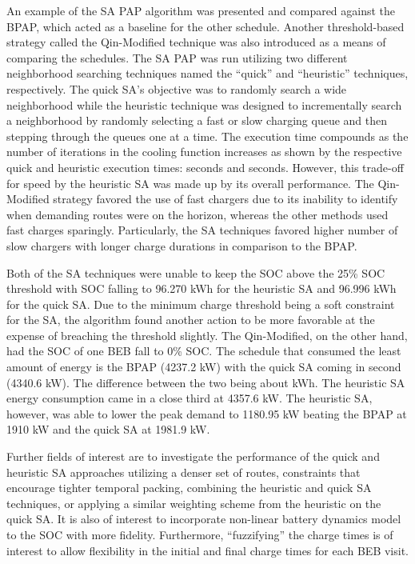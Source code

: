 \documentclass[energies,article,submit,moreauthors]{Definitions/mdpi}
\newcommand{\tempcnt}{3832 }                                                    %
\newcommand{\quicklocal}{0.4 }                                                  %
\newcommand{\heuristiclocal}{0.5 }                                              %
\begin{document}
An example of the SA PAP algorithm was presented and compared against the BPAP, which acted as a baseline for the other
schedule. Another threshold-based strategy called the Qin-Modified technique was also introduced as a means of comparing
the schedules. The SA PAP was run utilizing two different neighborhood searching techniques named the ``quick'' and
``heuristic'' techniques, respectively. The quick SA's objective was to randomly search a wide neighborhood while the
heuristic technique was designed to incrementally search a neighborhood by randomly selecting a fast or slow charging
queue and then stepping through the queues one at a time. The execution time compounds as the number of iterations in
the cooling function increases as shown by the respective quick and heuristic execution times:
\fpeval{\quicklocal * \tempcnt} seconds and \fpeval{\heuristiclocal * \tempcnt} seconds. However,
this trade-off for speed by the heuristic SA was made up by its overall performance. The Qin-Modified strategy favored
the use of fast chargers due to its inability to identify when demanding routes were on the horizon, whereas the other
methods used fast charges sparingly. Particularly, the SA techniques favored higher number of slow chargers with longer
charge durations in comparison to the BPAP.

Both of the SA techniques were unable to keep the SOC above the 25\% SOC threshold with SOC falling to 96.270 kWh for the
heuristic SA and 96.996 kWh for the quick SA. Due to the minimum charge threshold being a soft constraint for the SA,
the algorithm found another action to be more favorable at the expense of breaching the threshold slightly. The
Qin-Modified, on the other hand, had the SOC of one BEB fall to 0\% SOC. The schedule that consumed the least amount of
energy is the BPAP (4237.2 kW) with the quick SA coming in second (4340.6 kW). The difference between the two being
about  kWh. The heuristic SA energy consumption came in a close third at 4357.6 kW.
The heuristic SA, however, was able to lower the peak demand to 1180.95 kW beating the BPAP at 1910 kW and the quick SA
at 1981.9 kW.

Further fields of interest are to investigate the performance of the quick and heuristic SA approaches utilizing a
denser set of routes, constraints that encourage tighter temporal packing, combining the heuristic and quick SA
techniques, or applying a similar weighting scheme from the heuristic on the quick SA. It is also of interest to
incorporate non-linear battery dynamics model to the SOC with more fidelity. Furthermore, ``fuzzifying'' the charge times
is of interest to allow flexibility in the initial and final charge times for each BEB visit.
\vspace{6pt}
\end{document}
